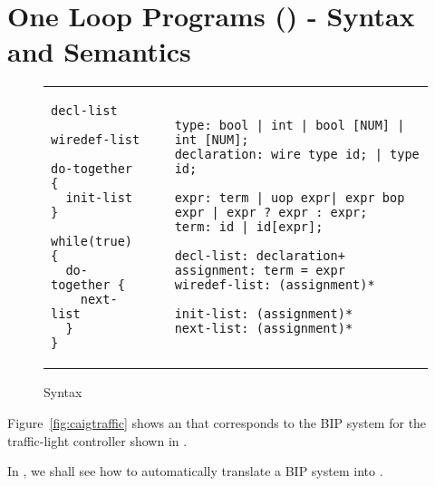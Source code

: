 \section{One Loop Programs (\caig) - Syntax and Semantics}
\label{sec:this}





\begin{figure*}
\begin{tabular}{p{3cm}p{0.2cm}p{10cm}}
\begin{lstlisting}
decl-list

wiredef-list

do-together {
  init-list 
}

while(true) {
  do-together {
    next-list
  } 
}
\end{lstlisting}
&
&
\begin{lstlisting}
type: bool | int | bool [NUM] | int [NUM]; 
declaration: wire type id; | type id;

expr: term | uop expr| expr bop expr | expr ? expr : expr;
term: id | id[expr]; 

decl-list: declaration+
assignment: term = expr
wiredef-list: (assignment)*

init-list: (assignment)* 
next-list: (assignment)* 
\end{lstlisting}
\end{tabular}
\caption{\caig Syntax}
\label{fig:gr}
\end{figure*}
%
\begin{example}
Figure~\ref{fig:caigtraffic} shows an \caig that corresponds to the BIP system for the traffic-light controller shown in . 

\end{example}
%
In , we shall see how to automatically translate a BIP system into \caig.
